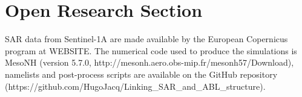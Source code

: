 \documentclass[draft]{agujournal2019} %
\begin{document}
		
		
		\appendix		
			
			
				
				
        \section*{Open Research Section}

        SAR data from Sentinel-1A are made available by the European Copernicus program at WEBSITE. The numerical code used to produce the simulations is MesoNH (version 5.7.0, http://mesonh.aero.obs-mip.fr/mesonh57/Download), namelists and post-process scripts are available on the GitHub repository (https://github.com/HugoJacq/Linking\_SAR\_and\_ABL\_structure).
    



        \acknowledgments
         
				
			
        
        
        
        \newpage
             		
			
   
			
\end{document}

